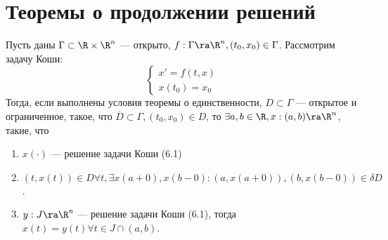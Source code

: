 
\section{Теоремы о продолжении решений}

\begin{theorem}
    Пусть даны \(\Gamma \subset \R \times \R^n\) --- открыто, \(f: \Gamma \ra \R^n, (t_0, x_0) \in \Gamma\). Рассмотрим задачу Коши:
    \begin{equation}
        \begin{cases}
            x' = f(t, x) \\
            x(t_0) = x_0
        \end{cases}
    \end{equation}
    Тогда, если выполнены условия теоремы о единственности, \(D \subset \Gamma\) --- открытое и ограниченное, такое, что \(\overline{D} \subset \Gamma, (t_0, x_0) \in D\), то \(\exists a, b \in \R, x: (a, b) \ra \R^n\), такие, что
    \begin{enumerate}
        \item \(x(\cdot)\) --- решение задачи Коши (6.1)
        \item \((t, x(t)) \in D \forall t, \exists x(a + 0), x(b - 0): (a, x(a + 0)), (b, x(b - 0)) \in \delta D\).
        \item \(y: J \ra \R^n\) --- решение задачи Коши (6.1), тогда \(x(t) = y(t) \forall t \in J \cap (a, b)\).
    \end{enumerate}
\end{theorem}
